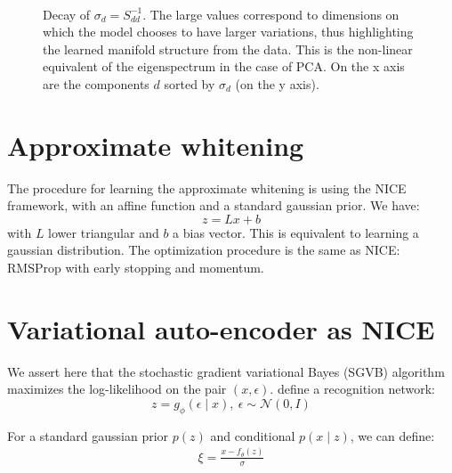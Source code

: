 \documentclass{article}
\def\N{{\mathcal{N}}}
\begin{document}
\begin{figure}[t]
    \centering {}
    \\
    \caption{Decay of $\sigma_{d} = S_{dd}^{-1}$. The large values correspond to dimensions
        on which the model chooses to have larger variations, thus highlighting
        the learned manifold structure from the data. This is the non-linear equivalent
        of the eigenspectrum in the case of PCA. On the x axis are the components $d$ sorted
        by $\sigma_{d}$ (on the y axis).}
    \label{fig:decay}
\end{figure}

\section{Approximate whitening}
The procedure for learning the approximate whitening is using the NICE framework, with an
affine function and a standard gaussian prior. We have:
\[
z = Lx + b
\]
with $L$ lower triangular and $b$ a bias vector. This is equivalent to learning a gaussian distribution.
The optimization procedure is the same as NICE: RMSProp with early stopping and momentum.

\section{Variational auto-encoder as NICE}
\label{appendix:vae}
We assert here that the stochastic gradient variational Bayes (SGVB) algorithm maximizes the log-likelihood on the pair $(x, \epsilon).
$\citep{Kingma+Welling-ICLR2014} define a recognition network:
\[
z = g_{\phi}(\epsilon \mid x),~\epsilon \sim \N(0, I)
\]

For a standard gaussian prior $p(z)$ and conditional $p(x \mid z)$, we can define:
\begin{align*}
\xi = \frac{x - f_{\theta}(z)}{\sigma}
\end{align*}
\end{document}
